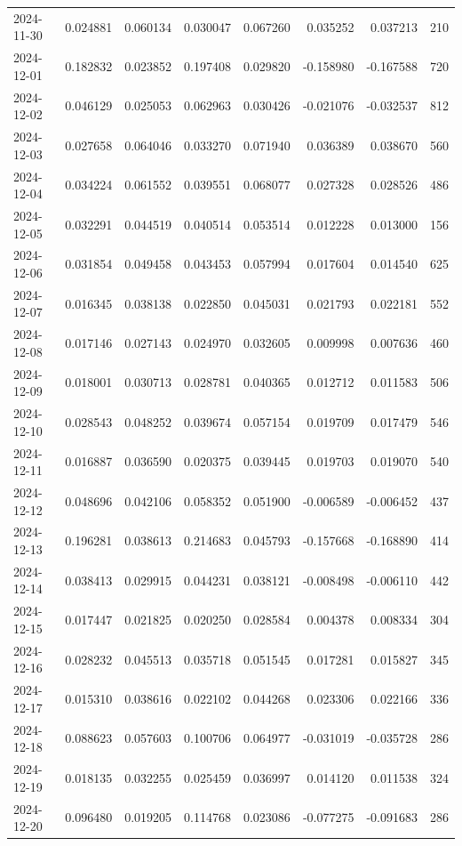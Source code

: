 \begin{tabular}{lrrrrrrr}
2024-11-30 & 0.024881 & 0.060134 & 0.030047 & 0.067260 & 0.035252 & 0.037213 & 210 \\
2024-12-01 & 0.182832 & 0.023852 & 0.197408 & 0.029820 & -0.158980 & -0.167588 & 720 \\
2024-12-02 & 0.046129 & 0.025053 & 0.062963 & 0.030426 & -0.021076 & -0.032537 & 812 \\
2024-12-03 & 0.027658 & 0.064046 & 0.033270 & 0.071940 & 0.036389 & 0.038670 & 560 \\
2024-12-04 & 0.034224 & 0.061552 & 0.039551 & 0.068077 & 0.027328 & 0.028526 & 486 \\
2024-12-05 & 0.032291 & 0.044519 & 0.040514 & 0.053514 & 0.012228 & 0.013000 & 156 \\
2024-12-06 & 0.031854 & 0.049458 & 0.043453 & 0.057994 & 0.017604 & 0.014540 & 625 \\
2024-12-07 & 0.016345 & 0.038138 & 0.022850 & 0.045031 & 0.021793 & 0.022181 & 552 \\
2024-12-08 & 0.017146 & 0.027143 & 0.024970 & 0.032605 & 0.009998 & 0.007636 & 460 \\
2024-12-09 & 0.018001 & 0.030713 & 0.028781 & 0.040365 & 0.012712 & 0.011583 & 506 \\
2024-12-10 & 0.028543 & 0.048252 & 0.039674 & 0.057154 & 0.019709 & 0.017479 & 546 \\
2024-12-11 & 0.016887 & 0.036590 & 0.020375 & 0.039445 & 0.019703 & 0.019070 & 540 \\
2024-12-12 & 0.048696 & 0.042106 & 0.058352 & 0.051900 & -0.006589 & -0.006452 & 437 \\
2024-12-13 & 0.196281 & 0.038613 & 0.214683 & 0.045793 & -0.157668 & -0.168890 & 414 \\
2024-12-14 & 0.038413 & 0.029915 & 0.044231 & 0.038121 & -0.008498 & -0.006110 & 442 \\
2024-12-15 & 0.017447 & 0.021825 & 0.020250 & 0.028584 & 0.004378 & 0.008334 & 304 \\
2024-12-16 & 0.028232 & 0.045513 & 0.035718 & 0.051545 & 0.017281 & 0.015827 & 345 \\
2024-12-17 & 0.015310 & 0.038616 & 0.022102 & 0.044268 & 0.023306 & 0.022166 & 336 \\
2024-12-18 & 0.088623 & 0.057603 & 0.100706 & 0.064977 & -0.031019 & -0.035728 & 286 \\
2024-12-19 & 0.018135 & 0.032255 & 0.025459 & 0.036997 & 0.014120 & 0.011538 & 324 \\
2024-12-20 & 0.096480 & 0.019205 & 0.114768 & 0.023086 & -0.077275 & -0.091683 & 286 \\

\end{tabular}

